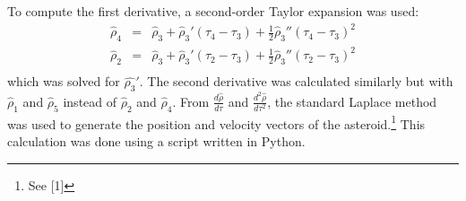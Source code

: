 \documentclass[12pt,journal,compsoc]{IEEEtran}
\begin{document}
To compute the first derivative, a second-order Taylor expansion was used:
\begin{eqnarray*}
\hat{\rho}_4&=&\hat{\rho}_3+\hat{\rho}_3' (\tau_4-\tau_3)+\frac{1}{2}\hat{\rho}_3'' (\tau_4-\tau_3)^2\\
\hat{\rho}_2&=&\hat{\rho}_3+\hat{\rho}_3' (\tau_2-\tau_3)+\frac{1}{2}\hat{\rho}_3'' (\tau_2-\tau_3) ^2\\
\end{eqnarray*}
which was solved for $\hat{\rho_3}'$.
The second derivative was calculated similarly but with $\hat{\rho}_1$ and $\hat{\rho}_5$ 
instead of $\hat{\rho}_2$ and $\hat{\rho}_4$.
From $\frac{d\hat{\rho}}{d\tau}$ and $\frac{d^2\hat{\rho}}{d\tau^2}$, 
the standard Laplace method was used to generate the position and velocity vectors of the asteroid.\footnote{See [1]}
This calculation was done using a script written in Python.
\end{document}
